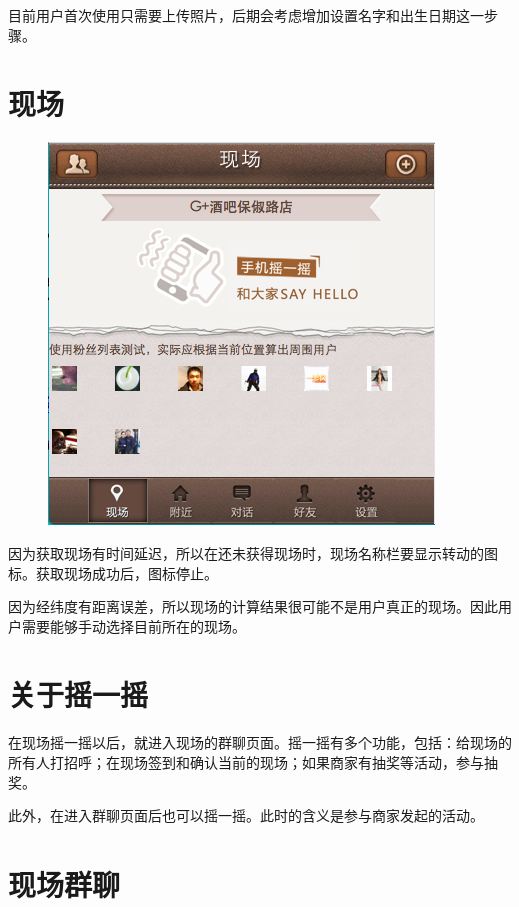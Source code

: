 \documentclass[cs4size]{ctexartutf8}
\begin{document}
目前用户首次使用只需要上传照片，后期会考虑增加设置名字和出生日期这一步骤。


\section{现场}

\begin{figure}[H]
\centering
\includegraphics[scale=0.5]{./3.png}
\end{figure}


因为获取现场有时间延迟，所以在还未获得现场时，现场名称栏要显示转动的图标。获取现场成功后，图标停止。

因为经纬度有距离误差，所以现场的计算结果很可能不是用户真正的现场。因此用户需要能够手动选择目前所在的现场。


\section{关于摇一摇}
在现场摇一摇以后，就进入现场的群聊页面。摇一摇有多个功能，包括：给现场的所有人打招呼；在现场签到和确认当前的现场；如果商家有抽奖等活动，参与抽奖。

此外，在进入群聊页面后也可以摇一摇。此时的含义是参与商家发起的活动。


\section{现场群聊}
\end{document}
